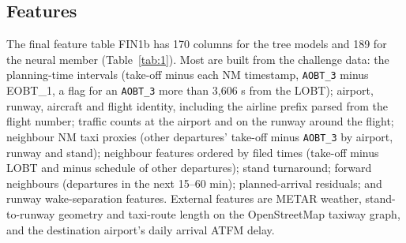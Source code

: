 \documentclass[
  manuscript=article,  %
  layout=preprint,     %
  year=2026,
  volume=4,
]{extra/joas}
\begin{document}
\subsection{Features}\label{features}

The final feature table FIN1b has 170 columns for the tree models and 189 for the neural member (Table~\ref{tab:1}). Most are built from the challenge data: the planning-time intervals (take-off minus each NM timestamp, \texttt{AOBT\_\allowbreak{}3} minus EOBT\_1, a flag for an \texttt{AOBT\_\allowbreak{}3} more than 3,606 s from the LOBT); airport, runway, aircraft and flight identity, including the airline prefix parsed from the flight number; traffic counts at the airport and on the runway around the flight; neighbour NM taxi proxies (other departures' take-off minus \texttt{AOBT\_\allowbreak{}3} by airport, runway and stand); neighbour features ordered by filed times (take-off minus LOBT and minus schedule of other departures); stand turnaround; forward neighbours (departures in the next 15--60 min); planned-arrival residuals; and runway wake-separation features. External features are METAR weather, stand-to-runway geometry and taxi-route length on the OpenStreetMap taxiway graph, and the destination airport's daily arrival ATFM delay.
\end{document}
